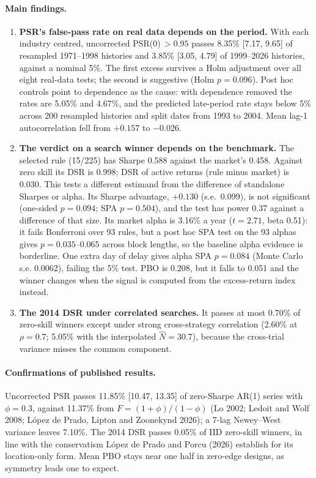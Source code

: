 \documentclass[10pt,a4paper]{article}
\begin{document}
\paragraph{Main findings.}
\begin{enumerate}
\item \textbf{PSR's false-pass rate on real data depends on the period.} With each industry centred, uncorrected PSR(0)$\,>0.95$ passes 8.35\% [7.17, 9.65] of resampled 1971--1998 histories and 3.85\% [3.05, 4.79] of 1999--2026 histories, against a nominal 5\%. The first excess survives a Holm adjustment over all eight real-data tests; the second is suggestive (Holm $p=0.096$). Post hoc controls point to dependence as the cause: with dependence removed the rates are 5.05\% and 4.67\%, and the predicted late-period rate stays below 5\% across 200 resampled histories and split dates from 1993 to 2004. Mean lag-1 autocorrelation fell from $+0.157$ to $-0.026$.
\item \textbf{The verdict on a search winner depends on the benchmark.} The selected rule (15/225) has Sharpe 0.588 against the market's 0.458. Against zero skill its DSR is 0.998; DSR of active returns (rule minus market) is 0.030. This tests a different estimand from the difference of standalone Sharpes or alpha. Its Sharpe advantage, $+0.130$ (s.e.\ 0.099), is not significant (one-sided $p=0.094$; SPA $p=0.504$), and the test has power 0.37 against a difference of that size. Its market alpha is 3.16\% a year ($t=2.71$, beta 0.51): it fails Bonferroni over 93 rules, but a post hoc SPA test on the 93 alphas gives $p=0.035$--0.065 across block lengths, so the baseline alpha evidence is borderline. One extra day of delay gives alpha SPA $p=0.084$ (Monte Carlo s.e. 0.0062), failing the 5\% test. PBO is 0.208, but it falls to 0.051 and the winner changes when the signal is computed from the excess-return index instead.
\item \textbf{The 2014 DSR under correlated searches.} It passes at most 0.70\% of zero-skill winners except under strong cross-strategy correlation (2.60\% at $\rho=0.7$; 5.05\% with the interpolated $\hat N=30.7$), because the cross-trial variance misses the common component.
\end{enumerate}

\paragraph{Confirmations of published results.} Uncorrected PSR passes 11.85\% [10.47, 13.35] of zero-Sharpe AR(1) series with $\phi=0.3$, against 11.37\% from $F=(1+\phi)/(1-\phi)$ (Lo 2002; Ledoit and Wolf 2008; L\'opez de Prado, Lipton and Zoonekynd 2026); a 7-lag Newey--West variance leaves 7.10\%. The 2014 DSR passes 0.05\% of IID zero-skill winners, in line with the conservatism L\'opez de Prado and Porcu (2026) establish for its location-only form. Mean PBO stays near one half in zero-edge designs, as symmetry leads one to expect.
\end{document}
